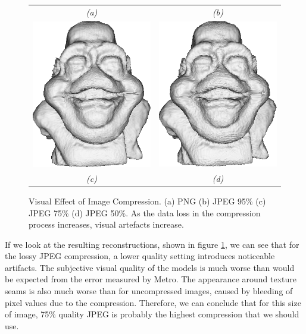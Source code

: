 \begin{figure}
\begin{center}
\begin{tabular}{cc}
{\it (a)} & {\it (b)} \\
\includegraphics[width=6cm]{../images/compress_jpg75} &
\includegraphics[width=6cm]{../images/compress_jpg50} \\
{\it (c)} & {\it (d)}
\end{tabular}
\caption[Visual Effect of Image Compression]{\label{fig:visual} Visual Effect of Image Compression. (a) PNG (b) JPEG 95\% (c) JPEG 75\% (d) JPEG 50\%. As the data loss in the compression process increases, visual artefacts increase.}
\end{center}
\end{figure}

If we look at the resulting reconstructions, shown in figure \ref{fig:visual}, we can see that for the lossy JPEG compression, a lower quality setting introduces noticeable artifacts. The subjective visual quality of the models is much worse than would be expected from the error measured by Metro. The appearance around texture seams is also much worse than for uncompressed images, caused by bleeding of pixel values due to the compression. Therefore, we can conclude that for this size of image, 75\% quality JPEG is probably the highest compression that we should use. 


